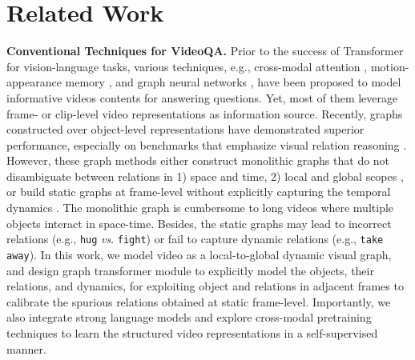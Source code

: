 \documentclass[runningheads]{llncs}
\newcommand{\eg}{e.g.}
\newcommand{\vs}{\textit{vs}. }
\begin{document}
\section{Related Work}
\vspace{-0.3cm}
\textbf{Conventional Techniques for VideoQA.}
Prior to the success of Transformer for vision-language tasks, various techniques, \eg, cross-modal attention \cite{jang2017tgif,li2019beyond,jiang2020divide}, motion-appearance memory \cite{gao2018motion,fan2019heterogeneous,liu2021hair}, and graph neural networks \cite{jiang2020reasoning,li2022invariant,park2021bridge}, have been proposed to model informative videos contents for answering questions. Yet, most of them leverage frame- or clip-level video representations as information source.  Recently, graphs constructed over object-level representations \cite{huang2020location,liu2021hair,seo2021attend,xiao2021video} have demonstrated superior performance, especially on benchmarks that emphasize visual relation reasoning \cite{jang2017tgif,shang2019annotating,shang2019relation,xiao2021next}.
However, these graph  methods either construct monolithic graphs that do not disambiguate between relations in 1) space and time, 2) local and global scopes \cite{huang2020location,wang2018videos}, or build static graphs at frame-level without explicitly capturing the temporal dynamics \cite{liu2021hair,peng2021progressive,xiao2021video}. The monolithic graph is cumbersome to long videos where multiple objects interact in space-time. Besides, the static graphs may lead to incorrect relations (\eg, \texttt{hug} \vs \texttt{fight}) or fail to capture dynamic relations (\eg, \texttt{take away}). In this work, we model video as a local-to-global dynamic visual graph, and design graph transformer module to explicitly model the objects, their relations, and dynamics, for  exploiting object and relations in adjacent frames to calibrate the spurious relations obtained at static frame-level. Importantly, we also integrate strong language models and explore cross-modal pretraining techniques to learn the structured video representations in a self-supervised manner.
\end{document}
